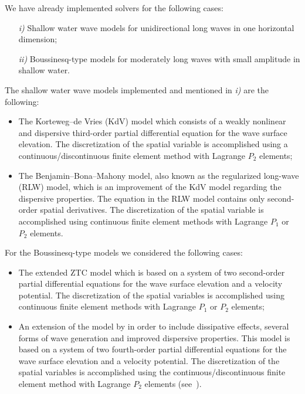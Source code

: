 We have already implemented solvers for the following cases:
\begin{itemize}
\item[{\it i)}] Shallow water wave models for unidirectional
  long waves in one horizontal dimension;
\item[{\it ii)}] Boussinesq-type models for moderately long
  waves with small amplitude in shallow water.
\end{itemize}
The shallow water wave models implemented and mentioned in {\it i)} are the following:
\begin{itemize}
\item The Korteweg--de Vries (KdV) model which consists of a
  weakly nonlinear and dispersive third-order partial
  differential equation for the wave surface elevation. The
  discretization of the spatial variable is accomplished
  using a continuous/discontinuous finite element method
  with Lagrange $P_2$ elements;

\item The Benjamin--Bona--Mahony model, also known as the
  regularized long-wave (RLW) model, which is an improvement
  of the KdV model regarding the dispersive properties.  The
  equation in the RLW model contains only second-order
  spatial derivatives. The discretization of the
  spatial variable is accomplished using continuous finite
  element methods with Lagrange $P_1$ or $P_2$ elements.
\end{itemize}
For the Boussinesq-type models we considered the following
cases:
\begin{itemize}
\item The extended ZTC model which is based on
  a system of two second-order partial differential
  equations for the wave surface elevation and a velocity
  potential. The discretization of the spatial variables is
  accomplished using continuous finite element methods with
  Lagrange $P_1$ or $P_2$ elements;

 \item An extension of the model by \cite{ChenLiu1994} in
   order to include dissipative effects, several forms of
   wave generation and improved dispersive properties.  This
   model is based on a system of two fourth-order partial
   differential equations for the wave surface elevation and
   a velocity potential. The discretization of the spatial
   variables is accomplished using the
   continuous/discontinuous finite element method with
   Lagrange $P_2$ elements
   (see~\cite{LopesPereiraTrabucho}).
\end{itemize}

